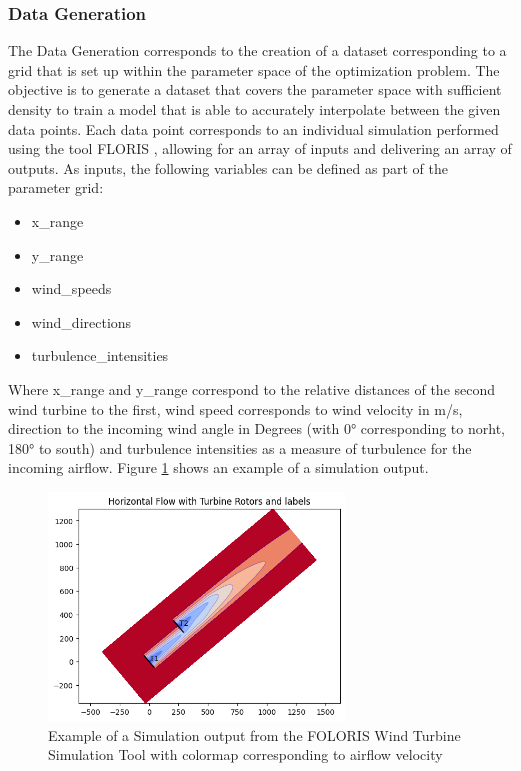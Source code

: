 \subsubsection{Data Generation}

The Data Generation corresponds to the creation of a dataset corresponding to a grid that is set up within the parameter space of the optimization problem. The objective is to generate a dataset that covers the parameter space with sufficient density to train a model that is able to accurately interpolate between the given data points. Each data point corresponds to an individual simulation performed using the tool FLORIS \cite{nrel_floris_web}, allowing for an array of inputs and delivering an array of outputs. As inputs, the following variables can be defined as part of the parameter grid:

\begin{itemize}
	\item x\_range
	\item y\_range
	\item wind\_speeds
	\item wind\_directions
	\item turbulence\_intensities
\end{itemize}

Where x\_range and y\_range correspond to the relative distances of the second wind turbine to the first, wind speed corresponds to wind velocity in m/s,  direction to the incoming wind angle in Degrees (with 0° corresponding to norht, 180° to south) and turbulence intensities as a measure of turbulence for the incoming airflow. Figure \ref{fig:Floris} shows an example of a simulation output. 


\begin{figure}[h] 
	\centering
	\includegraphics[width=0.7\textwidth]{figures/modelling/Floris.png} 
	\caption{Example of a Simulation output from the FOLORIS Wind Turbine Simulation Tool \cite{nrel_floris} with colormap corresponding to airflow velocity}
	\label{fig:Floris}
\end{figure}

